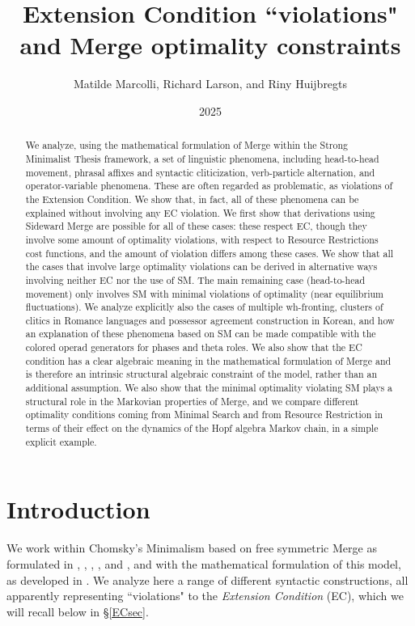 \documentclass[12pt]{amsart}
\title[Extension Condition]{Extension Condition ``violations" and Merge optimality constraints}
\author[M.Marcolli, R.K.Larson, R.Huijbregts]{Matilde Marcolli, Richard Larson, and Riny Huijbregts}
\date{2025}
\numberwithin{equation}{section}
\begin{document}
\maketitle

\begin{abstract}
We analyze, using the mathematical formulation of Merge within the Strong Minimalist Thesis framework, 
a set of linguistic phenomena, including head-to-head movement, phrasal affixes and
syntactic cliticization, verb-particle alternation, and operator-variable phenomena. These are often
regarded as problematic, as violations of the Extension Condition. We show that, in fact, all of these
phenomena can be explained without involving any EC violation. We first show that derivations
using Sideward Merge are possible for all of these cases: these respect EC, though they involve 
some amount of optimality violations, with respect to Resource Restrictions cost functions, and
the amount of violation differs among these cases. We show that all the cases that involve
large optimality violations can be derived in alternative ways involving neither EC nor the use of SM.
The main remaining case (head-to-head movement) only involves SM with minimal violations of
optimality (near equilibrium fluctuations). We analyze explicitly also the cases of multiple wh-fronting,
clusters of clitics in Romance languages and possessor agreement construction in Korean, and how
an explanation of these phenomena based on SM can be made compatible with the colored operad
generators for phases and theta roles. We also show that the EC condition has a clear
algebraic meaning in the mathematical formulation of Merge and is therefore an intrinsic 
structural algebraic constraint of the model, rather than an additional assumption. 
We also show that the minimal optimality violating SM plays a structural role in the Markovian 
properties of Merge, and we compare different optimality conditions coming from Minimal Search and from
Resource Restriction in terms of their effect on the dynamics of the Hopf algebra Markov chain, in a
simple explicit example. 
\end{abstract}

\setcounter{tocdepth}{4}
\tableofcontents

\section{Introduction}

We work within Chomsky's Minimalism based on free symmetric Merge as formulated in
\cite{ChomskyUCLA}, \cite{ChomskyGK}, \cite{ChomskyGE}, \cite{ChomskyKeio},
and \cite{ChomskyElements}, and with the mathematical formulation of this model,
as developed in \cite{MCB}.
We analyze here a range of different syntactic constructions, 
all apparently representing ``violations" to the {\em Extension Condition} (EC),
which we will recall below in \S \ref{ECsec}. 
\end{document}
